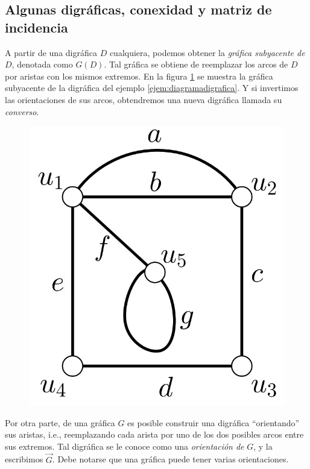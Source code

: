\subsection{Algunas digráficas, conexidad y matriz de incidencia}
 A partir de una digráfica $D$ cualquiera, podemos obtener la \textit{gráfica subyacente de} $D$, denotada como $G(D)$. Tal gráfica se obtiene de reemplazar los arcos de $D$ por aristas con los mismos extremos. En la figura \ref{fig:subyacente} se muestra la gráfica subyacente de la digráfica del ejemplo \ref{ejem:diagramadigrafica}. Y si invertimos las orientaciones de sus arcos, obtendremos una nueva digráfica llamada su \textit{converso}.
 \begin{figure}[h]
 \centering
    \includegraphics[scale=0.3]{img/imgchapter1/graficasubyacente.jpg}
    \caption{}
    \label{fig:subyacente}
 \end{figure} 
Por otra parte, de una gráfica $G$ es posible construir una digráfica ``orientando'' sus aristas, i.e., reemplazando cada arista por uno de los dos posibles arcos entre sus extremos. Tal digráfica se le conoce como una \textit{orientación de} $G$, y la escribimos $\overrightarrow{G}$. Debe notarse que una gráfica puede tener varias orientaciones.


